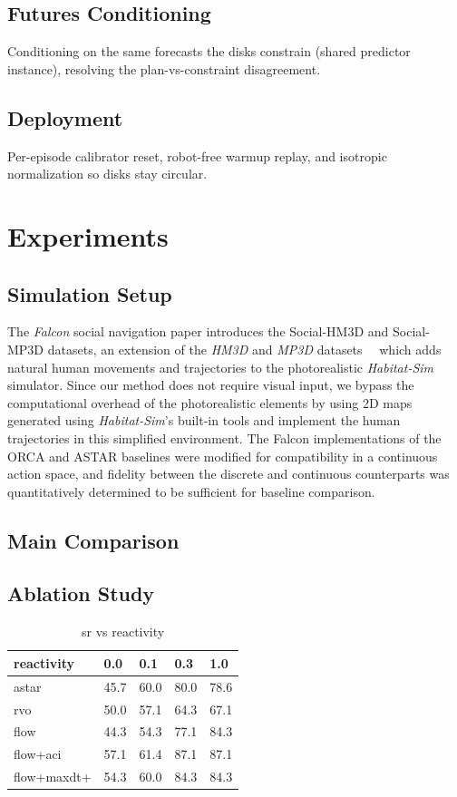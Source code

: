 \documentclass[letterpaper]{article} %
\begin{document}
\subsection{Futures Conditioning}
Conditioning on the same forecasts the disks constrain (shared predictor instance), resolving the plan-vs-constraint disagreement.
\subsection{Deployment}
Per-episode calibrator reset, robot-free warmup replay, and isotropic normalization so disks stay circular.

\section{Experiments}

\subsection{Simulation Setup}
The \textit{Falcon} social navigation paper \cite{falcon} introduces the Social-HM3D and Social-MP3D datasets, an extension of the \textit{HM3D} and \textit{MP3D} datasets~\cite{ramakrishnan_hm3d_2021}~\cite{chang_mp3d_2017} which adds natural human movements and trajectories to the photorealistic \textit{Habitat-Sim} simulator. Since our method does not require visual input, we bypass the computational overhead of the photorealistic elements by using 2D maps generated using \textit{Habitat-Sim}'s built-in tools and implement the human trajectories in this simplified environment. The Falcon implementations of the ORCA and ASTAR baselines were modified for compatibility in a continuous action space, and fidelity between the discrete and continuous counterparts was quantitatively determined to be sufficient for baseline comparison.

\subsection{Main Comparison}

\subsection{Ablation Study}


\begin{table}[!ht]
    \centering
    \begin{tabular}{|l|l|l|l|l|}
    \hline
        reactivity & 0.0 & 0.1 & 0.3 & 1.0 \\ \hline
        astar & 45.7 & 60.0 & 80.0 & 78.6 \\ \hline
        rvo & 50.0 & 57.1 & 64.3 & 67.1 \\ \hline
        flow & 44.3 & 54.3 & 77.1 & 84.3 \\ \hline
        flow+aci & 57.1 & 61.4 & 87.1 & 87.1 \\ \hline
        flow+maxdt+ & 54.3 & 60.0 & 84.3 & 84.3 \\ \hline
    \end{tabular}
    \caption{sr vs reactivity}
\end{table}
\end{document}
